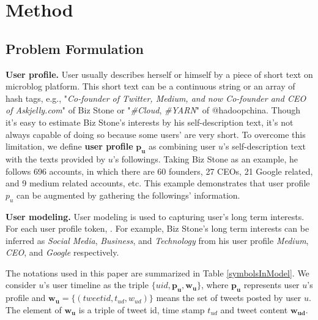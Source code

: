 \documentclass{llncs}
\begin{document}




\section{Method}
\subsection{Problem Formulation}
\textbf{User profile.} User usually describes herself or himself by a piece of short text on microblog platform.
This short text can be a continuous string or an array of hash tags, e.g., "\textit{Co-founder of Twitter, Medium, and now Co-founder and CEO of Askjelly.com}" of Biz Stone or "\textit{\#Cloud}, \textit{\#YARN}" of @hadoopchina.
Though it's easy to estimate Biz Stone's interests by his self-description text, it's not always capable of doing so because some users' are very short.
To overcome this limitation, we define \textbf{user profile} \(\bm{p_u}\) as combining user \(u\)'s self-description text with the texts provided by \(u\)'s followings. 
Taking Biz Stone as an example, he follows 696 accounts, in which there are 60 founders, 27 CEOs, 21 Google related, and 9 medium related accounts, etc. 
This example demonstrates that user profile \(p_u\) can be augmented by gathering the followings' information.

\textbf{User modeling.} 
User modeling is used to capturing user's long term interests. 
For each user profile token, .
For example, Biz Stone's long term interests can be inferred as \textit{Social Media}, \textit{Business}, and \textit{Technology} from his user profile \textit{Medium}, \textit{CEO}, and \textit{Google} respectively.

The notations used in this paper are summarized in Table \ref{symbolsInModel}.
We consider \(u\)'s user timeline as  the triple \(\{uid, \bm{p_u},\bm{w_u}\} \), where \(\bm{p_u}\) represents user \(u\)'s profile and \(\bm{w_u}=\{(tweetid, t_{ud},w_{ud})\}\) means the set of tweets posted by user \(u\).
The element of \(\bm{w_u}\) is a triple of tweet id, time stamp \(t_{ud}\) and tweet content \(\bm{w_{ud}}\).
\end{document}

